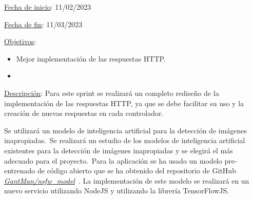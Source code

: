 
\underline{Fecha de inicio}: 11/02/2023

\underline{Fecha de fin}: 11/03/2023

\underline{Objetivos}:
\begin{itemize}
	\item Mejor implementación de las respuestas HTTP\@.
	\item {}
\end{itemize}

\underline{Descripción}:
Para este sprint se realizará un completo rediseño de la implementación de las respuestas HTTP, ya que se debe
facilitar su uso y la creación de nuevas respuestas en cada controlador.

Se utilizará un modelo de inteligencia artificial para la detección de imágenes inapropiadas.\ Se realizará un
estudio de los modelos de inteligencia artificial existentes para la detección de imágenes inapropiadas y se elegirá
el más adecuado para el proyecto.\ Para la aplicación se ha usado un modelo pre-entrenado de código abierto que se ha
obtenido del repositorio de GitHub
\href{https://github.com/GantMan/nsfw_model}{\textit{GantMan/nsfw\_model}}~\cite{nsfw-model-repo}.
La implementación de este modelo se realizará en un nuevo servicio utilizando NodeJS y utilizando la librería
TensorFlowJS\@.


